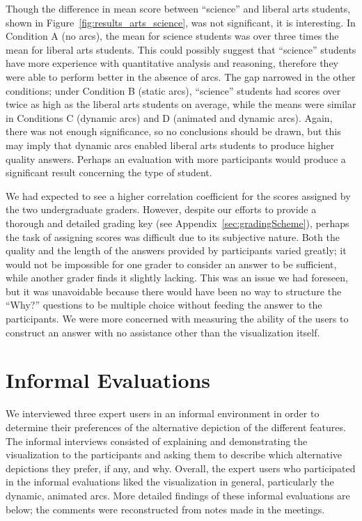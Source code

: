 Though the difference in mean score between ``science'' and liberal arts students, shown in Figure~\ref{fig:results_arts_science}, was not significant, it is interesting.  In Condition A (no arcs), the mean for science students was over three times the mean for liberal arts students.  This could possibly suggest that ``science'' students have more experience with quantitative analysis and reasoning, therefore they were able to perform better in the absence of arcs.  The gap narrowed in the other conditions; under Condition B (static arcs), ``science'' students had scores over twice as high as the liberal arts students on average, while the means were similar in Conditions C (dynamic arcs) and D (animated and dynamic arcs).  Again, there was not enough significance, so no conclusions should be drawn, but this may imply that dynamic arcs enabled liberal arts students to produce higher quality answers.  Perhaps an evaluation with more participants would produce a significant result concerning the type of student.

We had expected to see a higher correlation coefficient for the scores assigned by the two undergraduate graders.  However, despite our efforts to provide a thorough and detailed grading key (see Appendix~\ref{sec:gradingScheme}), perhaps the task of assigning scores was difficult due to its subjective nature.  Both the quality and the length of the answers provided by participants varied greatly; it would not be impossible for one grader to consider an answer to be sufficient, while another grader finds it slightly lacking.  This was an issue we had foreseen, but it was unavoidable because there would have been no way to structure the ``Why?'' questions to be multiple choice without feeding the answer to the participants.  We were more concerned with measuring the ability of the users to construct an answer with no assistance other than the visualization itself.

\section{Informal Evaluations}

We interviewed three expert users in an informal environment in order to determine their preferences of the alternative depiction of the different features.  The informal interviews consisted of explaining and demonstrating the visualization to the participants and asking them to describe which alternative depictions they prefer, if any, and why.  Overall, the expert users who participated in the informal evaluations liked the visualization in general, particularly the dynamic, animated arcs.  More detailed findings of these informal evaluations are below; the comments were reconstructed from notes made in the meetings.

